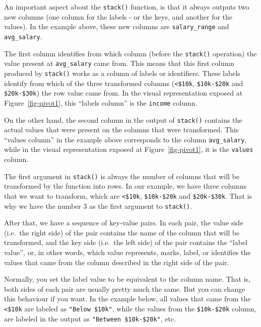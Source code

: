\documentclass[
  11pt,
  letterpaper,
  DIV=11,
  numbers=noendperiod]{scrreprt}
\begin{document}
An important aspect about the \texttt{stack()} function, is that it
always outputs two new columns (one column for the labels - or the keys,
and another for the values). In the example above, these new columns are
\texttt{salary\_range} and \texttt{avg\_salary}.

The first column identifies from which column (before the
\texttt{stack()} operation) the value present at \texttt{avg\_salary}
came from. This means that this first column produced by
\texttt{stack()} works as a column of labels or identifiers. These
labels identify from which of the three transformed columns
(\texttt{\textless{}\$10k}, \texttt{\$10k-\$20k} and
\texttt{\$20k-\$30k}) the row value came from. In the visual
representation exposed at Figure~\ref{fig-pivot1}, this ``labels
column'' is the \texttt{income} column.

On the other hand, the second column in the output of \texttt{stack()}
contains the actual values that were present on the columns that were
transformed. This ``values column'' in the example above corresponds to
the column \texttt{avg\_salary}, while in the visual representation
exposed at Figure~\ref{fig-pivot1}, it is the \texttt{values} column.

The first argument in \texttt{stack()} is always the number of columns
that will be transformed by the function into rows. In our example, we
have three columns that we want to transform, which are
\texttt{\textless{}\$10k}, \texttt{\$10k-\$20k} and
\texttt{\$20k-\$30k}. That is why we have the number 3 as the first
argument to \texttt{stack()}.

After that, we have a sequence of key-value pairs. In each pair, the
value side (i.e.~the right side) of the pair contains the name of the
column that will be transformed, and the key side (i.e.~the left side)
of the pair contains the ``label value'', or, in other words, which
value represents, marks, label, or identifies the values that came from
the column described in the right side of the pair.

Normally, you set the label value to be equivalent to the column name.
That is, both sides of each pair are usually pretty much the same. But
you can change this behaviour if you want. In the example below, all
values that came from the \texttt{\textless{}\$10k} are labeled as
\texttt{"Below\ \$10k"}, while the values from the \texttt{\$10k-\$20k}
column, are labeled in the output as \texttt{"Between\ \$10k-\$20k"},
etc.
\end{document}
